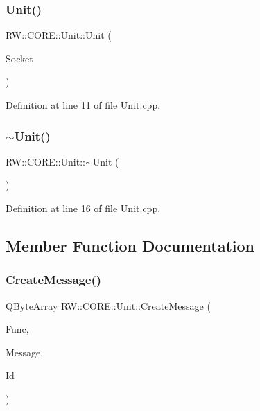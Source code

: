 \subsubsection{\texorpdfstring{Unit()}{Unit()}}
{\footnotesize\ttfamily R\+W\+::\+C\+O\+R\+E\+::\+Unit\+::\+Unit (\begin{DoxyParamCaption}\item[{Q\+Local\+Socket $\ast$}]{Socket }\end{DoxyParamCaption})}



Definition at line 11 of file Unit.\+cpp.

\hypertarget{class_r_w_1_1_c_o_r_e_1_1_unit_ae898e2ef0f245ceb1cae8cae17b8a6f9}{}\label{class_r_w_1_1_c_o_r_e_1_1_unit_ae898e2ef0f245ceb1cae8cae17b8a6f9} 
\subsubsection{\texorpdfstring{$\sim$\+Unit()}{~Unit()}}
{\footnotesize\ttfamily R\+W\+::\+C\+O\+R\+E\+::\+Unit\+::$\sim$\+Unit (\begin{DoxyParamCaption}{ }\end{DoxyParamCaption})}



Definition at line 16 of file Unit.\+cpp.



\subsection{Member Function Documentation}
\hypertarget{class_r_w_1_1_c_o_r_e_1_1_unit_af72c1a6126550786eac95439262b9718}{}\label{class_r_w_1_1_c_o_r_e_1_1_unit_af72c1a6126550786eac95439262b9718} 
\subsubsection{\texorpdfstring{Create\+Message()}{CreateMessage()}}
{\footnotesize\ttfamily Q\+Byte\+Array R\+W\+::\+C\+O\+R\+E\+::\+Unit\+::\+Create\+Message (\begin{DoxyParamCaption}\item[{Util\+::\+Functions}]{Func,  }\item[{Q\+Byte\+Array}]{Message,  }\item[{Util\+::\+Error\+ID}]{Id }\end{DoxyParamCaption})\hspace{0.3cm}{\ttfamily [private]}}



